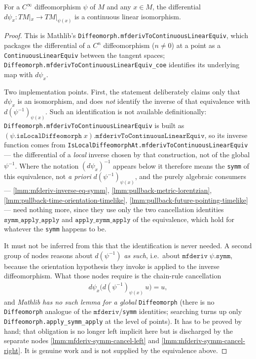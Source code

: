 \begin{lemma}
    \label{lmm:mfderiv-diffeo-linear-equiv}
    For a $C^\infty$ diffeomorphism $\psi$ of $M$ and any $x \in M$, the differential $d\psi_x : TM|_x \to TM|_{\psi(x)}$ is a continuous linear isomorphism.
\end{lemma}
\begin{proof}
    This is Mathlib's \texttt{Diffeomorph.mfderivToContinuousLinearEquiv}, which packages the differential of a $C^n$ diffeomorphism ($n \neq 0$) at a point as a \texttt{ContinuousLinearEquiv} between the tangent spaces; \texttt{Diffeomorph.mfderivToContinuousLinearEquiv\_coe} identifies its underlying map with $d\psi_x$.

    Two implementation points. First, the statement deliberately claims only that $d\psi_x$ is an isomorphism, and does \emph{not} identify the inverse of that equivalence with $d(\psi^{-1})_{\psi(x)}$. Such an identification is not available definitionally: \texttt{Diffeomorph.mfderivToContinuousLinearEquiv} is built as $(\psi.\mathtt{isLocalDiffeomorph}\;x).\mathtt{mfderivToContinuousLinearEquiv}$, so its inverse function comes from \texttt{IsLocalDiffeomorphAt.mfderivToContinuousLinearEquiv} --- the differential of a \emph{local} inverse chosen by that construction, not of the global $\psi^{-1}$. Where the notation $(d\psi_x)^{-1}$ appears below it therefore means the \texttt{symm} of this equivalence, not \emph{a priori} $d(\psi^{-1})_{\psi(x)}$, and the purely algebraic consumers --- \ref{lmm:mfderiv-inverse-eq-symm}, \ref{lmm:pullback-metric-lorentzian}, \ref{lmm:pullback-time-orientation-timelike}, \ref{lmm:pullback-future-pointing-timelike} --- need nothing more, since they use only the two cancellation identities $\mathtt{symm\_apply\_apply}$ and $\mathtt{apply\_symm\_apply}$ of the equivalence, which hold for whatever the \texttt{symm} happens to be.

    It must not be inferred from this that the identification is never needed. A second group of nodes reasons about $d(\psi^{-1})$ \emph{as such}, i.e.\ about $\mathtt{mfderiv}\;\psi.\mathtt{symm}$, because the orientation hypothesis they invoke is applied to the inverse diffeomorphism. What those nodes require is the chain-rule cancellation
    \begin{align}
        d\psi_x\big(d(\psi^{-1})_{\psi(x)}\,u\big) = u,
    \end{align}
    and \emph{Mathlib has no such lemma for a global} \texttt{Diffeomorph} (there is no \texttt{Diffeomorph} analogue of the $\mathtt{mfderiv}$/\texttt{symm} identities; searching turns up only \texttt{Diffeomorph.apply\_symm\_apply} at the level of points). It has to be proved by hand; that obligation is no longer left implicit here but is discharged by the separate nodes \ref{lmm:mfderiv-symm-cancel-left} and \ref{lmm:mfderiv-symm-cancel-right}. It is genuine work and is not supplied by the equivalence above.


\end{proof}
